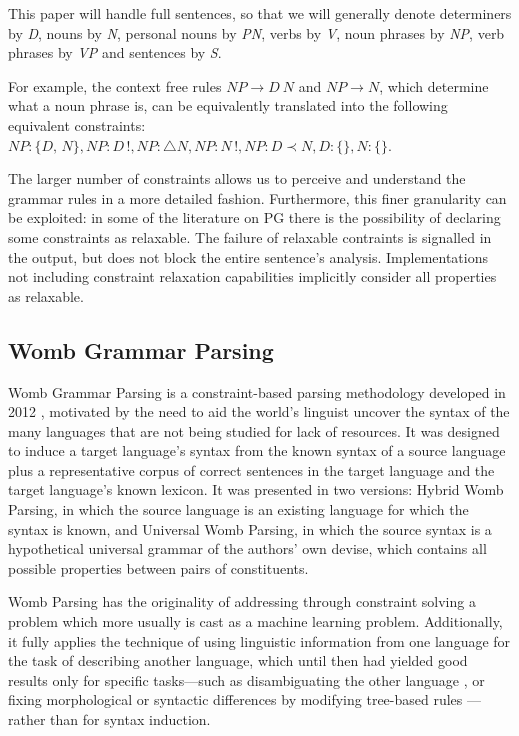 \documentclass{llncs}
\newcommand{\constituency}[2]{\textit{#1} : \textit{#2}}
\newcommand{\obligation}[2]{\textit{#1} : \triangle \textit{#2}}
\newcommand{\uniqueness}[2]{\textit{#1} : \textit{#2}\,!}
\newcommand{\precedence}[3]{\textit{#1} : \textit{#2} \prec \textit{#3}}
\newcommand{\PN}{\textit{PN}\xspace}
\newcommand{\NP}{\textit{NP}\xspace}
\newcommand{\VP}{\textit{VP}\xspace}
\newcommand{\Se}{\textit{S}\xspace}
\newcommand{\N}{\textit{N}\xspace}
\newcommand{\V}{\textit{V}\xspace}
\newcommand{\D}{\textit{D}\xspace}
\begin{document}
This paper will handle full sentences, so that we will generally denote determiners by \D, nouns by \N, personal nouns by \PN, verbs by \V, noun phrases by \NP, verb phrases by \VP and sentences by \Se.

\begin{example} For example, the context free rules $\NP\to D\ N$ and $\NP \to N$, which determine what a noun phrase is, can be equivalently translated into the following equivalent constraints: $\constituency{NP}{\{D, N\}}, \uniqueness{NP}{D}, \obligation{NP}{N}, \uniqueness{NP}{N}, \precedence{NP}{D}{N}, \constituency{D}{\{\}}, \constituency{N}{\{\}}$.
\end{example}

The larger number of constraints allows us to perceive and understand the grammar rules in a more detailed fashion. Furthermore, this finer granularity can be exploited: in some of the literature on PG there is the possibility of declaring some constraints as relaxable. The failure of relaxable contraints is signalled in the output, but does not block the entire sentence's analysis.  Implementations not including constraint relaxation capabilities implicitly consider all properties as relaxable.


 
%
\subsection{Womb Grammar Parsing}

%
 Womb Grammar Parsing   is a constraint-based parsing methodology developed in 2012 \cite {DM12}, motivated by the need to aid the world's linguist uncover the syntax of the many languages that are not being studied for lack of resources.
It was designed to induce a target language's syntax from the known syntax of a source language plus a representative corpus of correct sentences in the target language and the target language's known lexicon.  It was presented in two versions: Hybrid Womb Parsing, in which the source language is an existing language for which the syntax is known, and Universal Womb Parsing,  in which the source syntax is a hypothetical universal grammar of the authors' own devise, which contains all possible properties between pairs of constituents.

Womb Parsing has the originality of addressing through constraint solving a problem  which more usually is cast as a machine learning problem. Additionally, it fully applies the technique of using  linguistic information from one language for the task of describing another language, which until then had  yielded good results only for specific tasks---such as disambiguating the other language \cite{BurkKlein:2008}, or fixing morphological or syntactic differences by modifying tree-based rules \cite{Nicolas:towardsefficient}---rather than for syntax induction.
\end{document}
